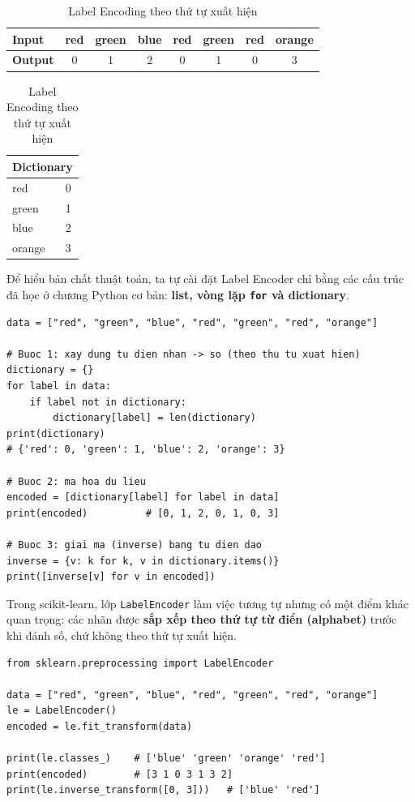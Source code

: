 \begin{table}[H]
\centering
\begin{tabular}{|l|c|c|c|c|c|c|c|}
\hline
\textbf{Input}  & red & green & blue & red & green & red & orange \\
\hline
\textbf{Output} & 0 & 1 & 2 & 0 & 1 & 0 & 3 \\
\hline
\end{tabular}
\quad
\begin{tabular}{|l|c|}
\hline
\multicolumn{2}{|c|}{\textbf{Dictionary}} \\
\hline
red & 0 \\ green & 1 \\ blue & 2 \\ orange & 3 \\
\hline
\end{tabular}
\caption{Label Encoding theo thứ tự xuất hiện}
\label{tab:labelenc}
\end{table}


Để hiểu bản chất thuật toán, ta tự cài đặt Label Encoder chỉ bằng các cấu trúc đã học ở chương Python cơ bản: \textbf{list, vòng lặp \texttt{for} và dictionary}.

\begin{lstlisting}[caption={Tự cài đặt Label Encoder bằng list, for và dictionary}]
data = ["red", "green", "blue", "red", "green", "red", "orange"]

# Buoc 1: xay dung tu dien nhan -> so (theo thu tu xuat hien)
dictionary = {}
for label in data:
    if label not in dictionary:
        dictionary[label] = len(dictionary)
print(dictionary)
# {'red': 0, 'green': 1, 'blue': 2, 'orange': 3}

# Buoc 2: ma hoa du lieu
encoded = [dictionary[label] for label in data]
print(encoded)          # [0, 1, 2, 0, 1, 0, 3]

# Buoc 3: giai ma (inverse) bang tu dien dao
inverse = {v: k for k, v in dictionary.items()}
print([inverse[v] for v in encoded])
\end{lstlisting}

Trong scikit-learn, lớp \texttt{LabelEncoder} làm việc tương tự nhưng có một điểm khác quan trọng: các nhãn được \textbf{sắp xếp theo thứ tự từ điển (alphabet)} trước khi đánh số, chứ không theo thứ tự xuất hiện.

\begin{lstlisting}[caption={Label Encoder với scikit-learn}]
from sklearn.preprocessing import LabelEncoder

data = ["red", "green", "blue", "red", "green", "red", "orange"]
le = LabelEncoder()
encoded = le.fit_transform(data)

print(le.classes_)    # ['blue' 'green' 'orange' 'red']
print(encoded)        # [3 1 0 3 1 3 2]
print(le.inverse_transform([0, 3]))   # ['blue' 'red']
\end{lstlisting}

